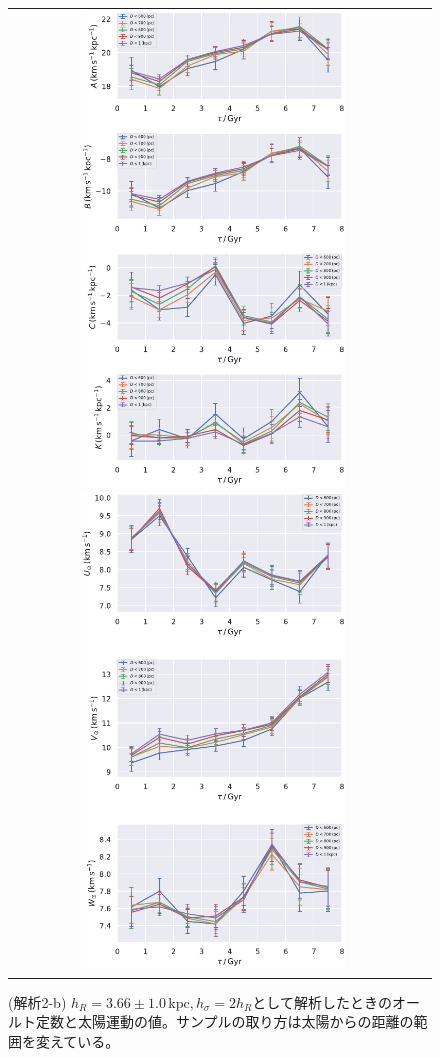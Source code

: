 \begin{figure}[htbp]
   \centering
\begin{tabular}{cc}
\includegraphics[width=7cm]{fig/ABCK_2b.pdf}
\includegraphics[width=7cm]{fig/UVW_2b.pdf}
\end{tabular}
    \caption{(解析2-b) $h_R=3.66\pm 1.0\,\mathrm{kpc},h_{\sigma}=2h_R$として解析したときのオールト定数と太陽運動の値。サンプルの取り方は太陽からの距離の範囲を変えている。}
    \label{figObs2b}
\end{figure}

